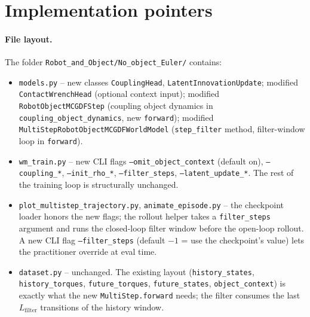 \documentclass[11pt]{article}
\begin{document}
\section{Implementation pointers}

\paragraph{File layout.}  The folder
\texttt{Robot\_and\_Object/No\_object\_Euler/} contains:
\begin{itemize}
  \item \texttt{models.py} -- new classes \texttt{CouplingHead},
    \texttt{LatentInnovationUpdate}; modified
    \texttt{ContactWrenchHead} (optional context input);
    modified \texttt{RobotObjectMCGDFStep}
    (coupling object dynamics in
    \texttt{coupling\_object\_dynamics}, new \texttt{forward});
    modified \texttt{MultiStepRobotObjectMCGDFWorldModel}
    (\texttt{step\_filter} method, filter-window loop in
    \texttt{forward}).
  \item \texttt{wm\_train.py} -- new CLI flags
    \texttt{--omit\_object\_context} (default on),
    \texttt{--coupling\_*}, \texttt{--init\_rho\_*},
    \texttt{--filter\_steps}, \texttt{--latent\_update\_*}.  The
    rest of the training loop is structurally unchanged.
  \item \texttt{plot\_multistep\_trajectory.py},
    \texttt{animate\_episode.py} -- the checkpoint loader honors the
    new flags; the rollout helper takes a \texttt{filter\_steps}
    argument and runs the closed-loop filter window before the
    open-loop rollout.  A new CLI flag
    \texttt{--filter\_steps} (default $-1$ = use the checkpoint's
    value) lets the practitioner override at eval time.
  \item \texttt{dataset.py} -- unchanged.  The existing layout
    (\texttt{history\_states}, \texttt{history\_torques},
    \texttt{future\_torques}, \texttt{future\_states},
    \texttt{object\_context}) is exactly what the new
    \texttt{MultiStep.forward} needs; the filter consumes the last
    $L_{\mathrm{filter}}$ transitions of the history window.
\end{itemize}
\end{document}
